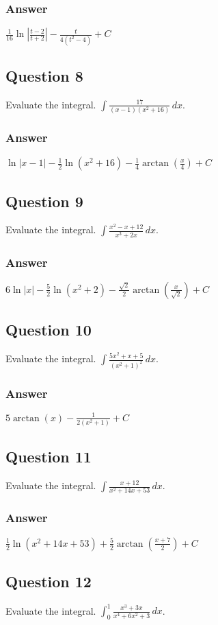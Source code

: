 \documentclass{article}
\begin{document}
\subsubsection*{Answer}
$ \frac{1}{16}\ln|\frac{t-2}{t+2}| - \frac{t}{4(t^2-4)} + C $

\subsection*{Question 8}
Evaluate the integral. $\int \frac{17}{(x-1)(x^2+16)} \,dx$.
\subsubsection*{Answer}
$ \ln|x-1| - \frac{1}{2}\ln(x^2+16) - \frac{1}{4}\arctan(\frac{x}{4}) + C $

\subsection*{Question 9}
Evaluate the integral. $\int \frac{x^2-x+12}{x^3+2x} \,dx$.
\subsubsection*{Answer}
$ 6\ln|x| - \frac{5}{2}\ln(x^2+2) - \frac{\sqrt{2}}{2}\arctan(\frac{x}{\sqrt{2}}) + C $

\subsection*{Question 10}
Evaluate the integral. $\int \frac{5x^2+x+5}{(x^2+1)^2} \,dx$.
\subsubsection*{Answer}
$ 5\arctan(x) - \frac{1}{2(x^2+1)} + C $

\subsection*{Question 11}
Evaluate the integral. $\int \frac{x+12}{x^2+14x+53} \,dx$.
\subsubsection*{Answer}
$ \frac{1}{2}\ln(x^2+14x+53) + \frac{5}{2}\arctan(\frac{x+7}{2}) + C $

\subsection*{Question 12}
Evaluate the integral. $\int_0^1 \frac{x^3+3x}{x^4+6x^2+3} \,dx$.
\end{document}
